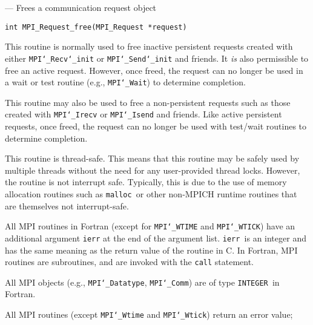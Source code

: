 \startmanpage
{}
--- Frees a communication request object 
\startvb\begin{verbatim}
int MPI_Request_free(MPI_Request *request)

\end{verbatim}
\endvb

\par
{}
\par
This routine is normally used to free inactive persistent requests created with
either {\tt MPI{\tt \char`\_}Recv{\tt \char`\_}init} or {\tt MPI{\tt \char`\_}Send{\tt \char`\_}init} and friends.  It {\em is} also
permissible to free an active request.  However, once freed, the request can no
longer be used in a wait or test routine (e.g., {\tt MPI{\tt \char`\_}Wait}) to determine
completion.
\par
This routine may also be used to free a non-persistent requests such as those
created with {\tt MPI{\tt \char`\_}Irecv} or {\tt MPI{\tt \char`\_}Isend} and friends.  Like active persistent
requests, once freed, the request can no longer be used with test/wait routines
to determine completion.
\par
{}
\par
This routine is thread-safe.  This means that this routine may be
safely used by multiple threads without the need for any user-provided
thread locks.  However, the routine is not interrupt safe.  Typically,
this is due to the use of memory allocation routines such as {\tt malloc
}or other non-MPICH runtime routines that are themselves not interrupt-safe.
\par
{}
All MPI routines in Fortran (except for {\tt MPI{\tt \char`\_}WTIME} and {\tt MPI{\tt \char`\_}WTICK}) have
an additional argument {\tt ierr} at the end of the argument list.  {\tt ierr
}is an integer and has the same meaning as the return value of the routine
in C.  In Fortran, MPI routines are subroutines, and are invoked with the
{\tt call} statement.
\par
All MPI objects (e.g., {\tt MPI{\tt \char`\_}Datatype}, {\tt MPI{\tt \char`\_}Comm}) are of type {\tt INTEGER
}in Fortran.
\par
{}
\par
All MPI routines (except {\tt MPI{\tt \char`\_}Wtime} and {\tt MPI{\tt \char`\_}Wtick}) return an error value;
